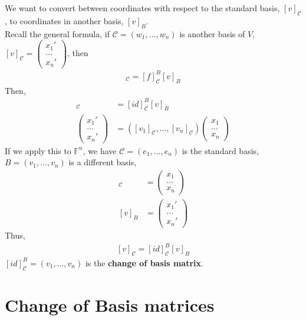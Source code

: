 \documentclass[letterpaper,12pt]{article}
\theoremstyle{definition}
\begin{document}
We want to convert between coordinates with respect to the standard basis, $[v]_{\mathcal{C}}$, to coordinates in another basis, $[v]_{B}$.
\\ Recall the general formula, if $\mathcal{C} = (w_1, \dots, w_n)$ is another basis of $V$, $[v]_{\mathcal{C}} = \begin{pmatrix} x_1' \\ \dots \\ x_n' \end{pmatrix}$, then
\begin{align*}
    [f(v)]_{\mathcal{C}} = [f]_{\mathcal{C}}^B [v]_{B}
\end{align*}
Then,
\begin{align*}
    [v]_{\mathcal{C}} & = [id]_{\mathcal{C}}^B [v]_{B} \\
    \begin{pmatrix} x_1' \\ \dots \\ x_n' \end{pmatrix} & = ([v_1]_{\mathcal{C}}, \dots, [v_n]_{\mathcal{C}}) \begin{pmatrix} x_1 \\ \dots \\ x_n \end{pmatrix}
\end{align*}
If we apply this to $\mathbb{F}^n$, we have $\mathcal{C} = (e_1, \dots, e_n)$ is the standard basis, $B = (v_1, \dots, v_n)$ is a different basis,
\begin{align*}
    [v]_{\mathcal{C}} & = \begin{pmatrix} x_1 \\ \dots \\ x_n \end{pmatrix} \\
    [v]_{B} & = \begin{pmatrix} x_1' \\ \dots \\ x_n' \end{pmatrix}
\end{align*}
Thus,
\begin{align*}
    \boxed{[v]_{\mathcal{C}} = [id]_{\mathcal{C}}^B [v]_{B}}
\end{align*}
$[id]_{\mathcal{C}}^B = (v_1, \dots, v_n)$ is the \textbf{change of basis matrix}.

\section*{Change of Basis matrices}
\end{document}
